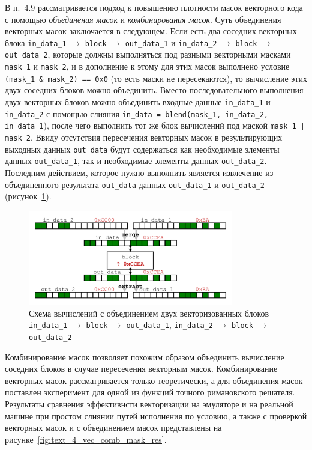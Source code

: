 \documentclass[a4paper,14pt]{extarticle}                     %
\theoremstyle{plain}                                         %
\begin{document}
В п.~4.9 рассматривается подход к повышению плотности масок векторного кода с помощью \textit{объединения масок} и \textit{комбинирования масок}.
Суть объединения векторных масок заключается в следующем.
Если есть два соседних векторных блока \texttt{in\_data\_1} $\rightarrow$ \texttt{block} $\rightarrow$ \texttt{out\_data\_1} и \texttt{in\_data\_2} $\rightarrow$ \texttt{block} $\rightarrow$ \texttt{out\_data\_2}, которые должны выполняться под разными векторными масками \texttt{mask\_1} и \texttt{mask\_2}, и в дополнение к этому для этих масок выполнено условие \texttt{(mask\_1 \& mask\_2) == 0x0} (то есть маски не пересекаются), то вычисление этих двух соседних блоков можно объединить.
Вместо последовательного выполнения двух векторных блоков можно объединить входные данные \texttt{in\_data\_1} и \texttt{in\_data\_2} с помощью слияния \texttt{in\_data = blend(mask\_1, in\_data\_2, in\_data\_1}), после чего выполнить тот же блок вычислений под маской \texttt{mask\_1 | mask\_2}.
Ввиду отсутствия пересечения векторных масок в результирующих выходных данных \texttt{out\_data} будут содержаться как необходимые элементы данных \texttt{out\_data\_1}, так и необходимые элементы данных \texttt{out\_data\_2}.
Последним действием, которое нужно выполнить является извлечение из объединенного результата \texttt{out\_data} данных \texttt{out\_data\_1} и \texttt{out\_data\_2} (рисунок~\ref{fig:text_4_vec_comb_mask_comb_masks}).

\begin{figure}[ht]
\centering
\includegraphics[width=0.8\textwidth]{./pics/text_4_vec_comb_mask/comb_masks.pdf}
\singlespacing
{}\caption{Схема вычислений с объединением двух векторизованных блоков \texttt{in\_data\_1} $\rightarrow$ \texttt{block} $\rightarrow$ \texttt{out\_data\_1}, \texttt{in\_data\_2} $\rightarrow$ \texttt{block} $\rightarrow$ \texttt{out\_data\_2}}
\label{fig:text_4_vec_comb_mask_comb_masks}
\end{figure}

Комбинирование масок позволяет похожим образом объединить вычисление соседних блоков в случае пересечения векторным масок.
Комбинирование векторных масок рассматривается только теоретически, а для объединения масок поставлен эксперимент для одной из функций точного римановского решателя.
Результаты сравнения эффективнсти векторизации на эмуляторе и на реальной машине при простом слиянии путей исполнения по условию, а также с проверкой векторных масок и с объединением масок представлены на рисунке~\ref{fig:text_4_vec_comb_mask_res}.
\end{document}
